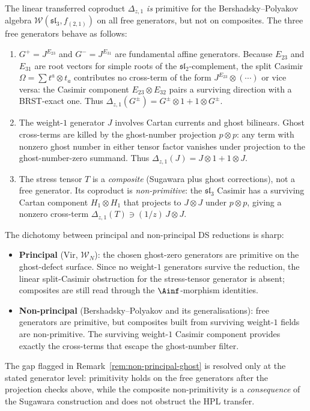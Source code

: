 \begin{remark}
\label{rem:bp-coproduct-resolved}
The linear transferred coproduct $\Delta_{z,1}$ \emph{is}
primitive for the Bershadsky--Polyakov algebra
$\mathcal{W}(\mathfrak{sl}_3, f_{(2,1)})$ on all free
generators, but not on composites. The three free generators
behave as follows:
\begin{enumerate}
\item $G^+ = J^{E_{23}}$ and $G^- = J^{E_{31}}$ are
 fundamental affine generators. Because $E_{23}$ and
 $E_{31}$ are root vectors for simple roots of the
 $\mathfrak{sl}_2$-complement, the split Casimir
 $\Omega = \sum t^a \otimes t_a$ contributes no cross-term
 of the form $J^{E_{23}} \otimes (\cdots)$ or vice versa:
 the Casimir component $E_{23} \otimes E_{32}$ pairs a
 surviving direction with a BRST-exact one. Thus
 $\Delta_{z,1}(G^\pm) = G^\pm \otimes 1 + 1 \otimes G^\pm$.
\item The weight-$1$ generator $J$ involves Cartan currents
 and ghost bilinears. Ghost cross-terms are killed by the
 ghost-number projection $p \otimes p$: any term with
 nonzero ghost number in either tensor factor vanishes
 under projection to the ghost-number-zero summand.
 Thus $\Delta_{z,1}(J) = J \otimes 1 + 1 \otimes J$.
\item The stress tensor $T$ is a \emph{composite} (Sugawara
 plus ghost corrections), not a free generator. Its
 coproduct is \emph{non-primitive}: the $\mathfrak{sl}_3$
 Casimir has a surviving Cartan component
 $H_1 \otimes H_1$ that projects to $J \otimes J$ under
 $p \otimes p$, giving a nonzero cross-term
 $\Delta_{z,1}(T) \ni (1/z)\, J \otimes J$.
\end{enumerate}
The dichotomy between principal and
non-principal DS reductions is sharp:
\begin{itemize}
\item \textbf{Principal} ($\mathrm{Vir}$, $\mathcal{W}_N$):
 the chosen ghost-zero generators are primitive on the ghost-defect
 surface. Since no weight-$1$ generators survive the reduction, the
 linear split-Casimir obstruction for the stress-tensor generator is
 absent; composites are still read through the \(\Ainf\)-morphism
 identities.
\item \textbf{Non-principal} (Bershadsky--Polyakov and its
 generalisations): free generators are primitive, but
 composites built from surviving weight-$1$ fields are
 non-primitive. The surviving weight-$1$ Casimir component
 provides exactly the cross-terms that escape the
 ghost-number filter.
\end{itemize}
The gap flagged in Remark~\ref{rem:non-principal-ghost} is resolved
only at the stated generator level: primitivity holds on the free
generators after the projection checks above, while the composite
non-primitivity is a \emph{consequence} of the Sugawara construction
and does not obstruct the HPL transfer.
\end{remark}

